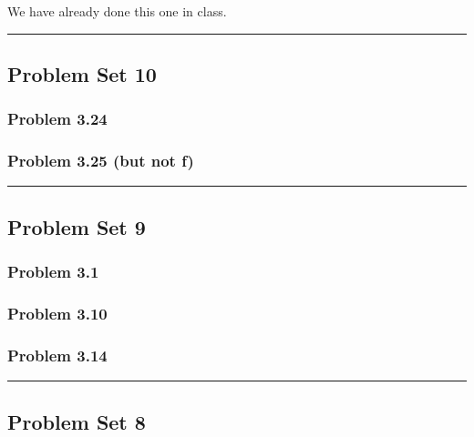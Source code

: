 \documentclass[11pt]{article}
\begin{document}
We have already done this one in class.

\begin{center}\rule{0.5\linewidth}{0.5pt}\end{center}

    \subsection{Problem Set 10}\label{problem-set-10}

\subsubsection{Problem 3.24}\label{problem-3.24}

\subsubsection{Problem 3.25 (but not f)}\label{problem-3.25-but-not-f}

\begin{center}\rule{0.5\linewidth}{0.5pt}\end{center}

    \subsection{Problem Set 9}\label{problem-set-9}

\subsubsection{Problem 3.1}\label{problem-3.1}

\subsubsection{Problem 3.10}\label{problem-3.10}

\subsubsection{Problem 3.14}\label{problem-3.14}

\begin{center}\rule{0.5\linewidth}{0.5pt}\end{center}

    \subsection{Problem Set 8}\label{problem-set-8}
\end{document}
